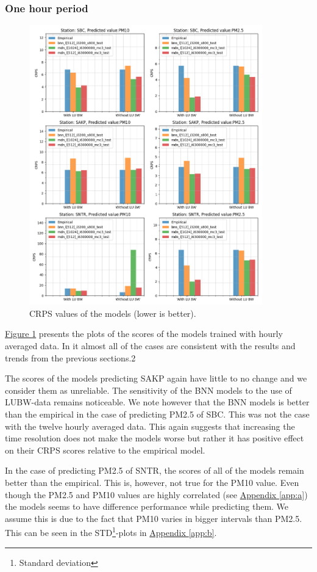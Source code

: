 \documentclass[12pt,a4paper,twoside]{scrartcl}
\numberwithin{equation}{section}
\newcommand{\reffig}[1]{\hyperref[#1]{Figure \ref*{#1}}}
\newcommand{\refapp}[1]{\hyperref[#1]{Appendix \ref*{#1}}}
\begin{document}
\subsubsection{One hour period}\label{sec:res-1h}
\begin{figure}[H] \centering \includegraphics[height=0.9\textwidth,
  width=0.9\textwidth]{figures/figs_1h/results_plot_CRPS}
  \caption[CRPS results (hourly average)]{CRPS values of the models
    (lower is better).}\label{fig:crps-1h}
\end{figure}

\reffig{fig:crps-1h} presents the plots of the scores of the models trained with hourly averaged data. In it almost all of the cases are consistent with the results and trends from the previous sections.2

The scores of the models predicting SAKP again have little to no change and we consider them as unreliable. The sensitivity of the BNN models to the use of LUBW-data remains noticeable. We note however that the BNN models is better than the empirical in the case of predicting PM2.5 of SBC. This was not the case with the twelve hourly averaged data. This again suggests that increasing the time resolution does not make the models worse but rather it has positive effect on their CRPS scores relative to the empirical model.

In the case of predicting PM2.5 of SNTR, the scores of all of the models remain better than the empirical. This is, however, not true for the PM10 value. Even though the PM2.5 and PM10 values are highly correlated (see \refapp{app:a}) the models seems to have difference performance while predicting them. We assume this is due to the fact that PM10 varies in bigger intervals than PM2.5. This can be seen in the STD\footnote{Standard deviation}-plots in \refapp{app:b}.
\end{document}
